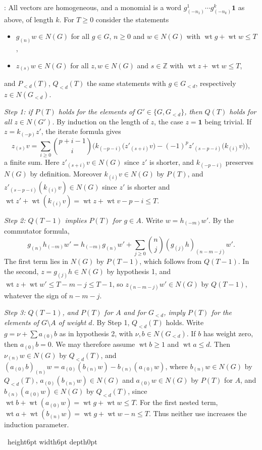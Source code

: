 \documentclass[leqno]{article}
\newcommand{\Z}{\ensuremath{\mathbb{Z}}}
\renewcommand{\leq}{\ensuremath{\leqslant}}
\renewcommand{\geq}{\ensuremath{\geqslant}}
\newcommand{\qed}{\hfill \vrule height6pt  width6pt depth0pt}
\newenvironment{proof}[1][]{\noindent {\it Proof #1} : }{\hbox{~}\qed
\smallskip
}
\numberwithin{equation}{section}
\begin{document}
\begin{proof}
All vectors are homogeneous, and a monomial is a word $g^1_{(-n_1)}\cdots g^k_{(-n_k)}\mathbf 1$ as above, of length $k$. For $T \geq 0$ consider the statements
\begin{itemize}
\item[$P(T)$:] $g_{(n)}w \in N(G)$ for all $g \in G$, $n \geq 0$ and $w \in N(G)$ with $\operatorname{wt}g + \operatorname{wt}w \leq T$,
\item[$Q(T)$:] $z_{(s)}w \in N(G)$ for all $z, w \in N(G)$ and $s \in \Z$ with $\operatorname{wt}z + \operatorname{wt}w \leq T$,
\end{itemize}
and $P_{<d}(T)$, $Q_{<d}(T)$ the same statements with $g \in G_{<d}$, respectively $z \in N(G_{<d})$.

\emph{Step 1: if $P(T)$ holds for the elements of $G' \in \{G, G_{<d}\}$, then $Q(T)$ holds for all $z \in N(G')$.} By induction on the length of $z$, the case $z = \mathbf 1$ being trivial. If $z = k_{(-p)}z'$, the iterate formula gives
\[
z_{(s)}v = \sum_{i \geq 0}\binom{p+i-1}{i}\Big(k_{(-p-i)}\big(z'_{(s+i)}v\big) - (-1)^p z'_{(s-p-i)}\big(k_{(i)}v\big)\Big),
\]
a finite sum. Here $z'_{(s+i)}v \in N(G)$ since $z'$ is shorter, and $k_{(-p-i)}$ preserves $N(G)$ by definition. Moreover $k_{(i)}v \in N(G)$ by $P(T)$, and $z'_{(s-p-i)}(k_{(i)}v) \in N(G)$ since $z'$ is shorter and $\operatorname{wt}z' + \operatorname{wt}(k_{(i)}v) = \operatorname{wt}z + \operatorname{wt}v - p - i \leq T$.

\emph{Step 2: $Q(T-1)$ implies $P(T)$ for $g \in A$.} Write $w = h_{(-m)}w'$. By the commutator formula,
\[
g_{(n)}h_{(-m)}w' = h_{(-m)}g_{(n)}w' + \sum_{j \geq 0}\binom{n}{j}(g_{(j)}h)_{(n-m-j)}w'.
\]
The first term lies in $N(G)$ by $P(T-1)$, which follows from $Q(T-1)$. In the second, $z = g_{(j)}h \in N(G)$ by hypothesis 1, and $\operatorname{wt}z + \operatorname{wt}w' \leq T - m - j \leq T - 1$, so $z_{(n-m-j)}w' \in N(G)$ by $Q(T-1)$, whatever the sign of $n - m - j$.

\emph{Step 3: $Q(T-1)$, and $P(T)$ for $A$ and for $G_{<d}$, imply $P(T)$ for the elements of $G \setminus A$ of weight $d$.} By Step 1, $Q_{<d}(T)$ holds. Write $g = \nu + \sum a_{(0)}b$ as in hypothesis 2, with $\nu, b \in N(G_{<d})$. If $b$ has weight zero, then $a_{(0)}b = 0$. We may therefore assume $\operatorname{wt}b \geq 1$ and $\operatorname{wt}a \leq d$. Then $\nu_{(n)}w \in N(G)$ by $Q_{<d}(T)$, and $(a_{(0)}b)_{(n)}w = a_{(0)}(b_{(n)}w) - b_{(n)}(a_{(0)}w)$, where $b_{(n)}w \in N(G)$ by $Q_{<d}(T)$, $a_{(0)}(b_{(n)}w) \in N(G)$ and $a_{(0)}w \in N(G)$ by $P(T)$ for $A$, and $b_{(n)}(a_{(0)}w) \in N(G)$ by $Q_{<d}(T)$, since $\operatorname{wt}b + \operatorname{wt}(a_{(0)}w) = \operatorname{wt}g + \operatorname{wt}w \leq T$. For the first nested term, $\operatorname{wt}a + \operatorname{wt}(b_{(n)}w) = \operatorname{wt}g + \operatorname{wt}w - n \leq T$. Thus neither use increases the induction parameter.


\end{proof}
\end{document}
